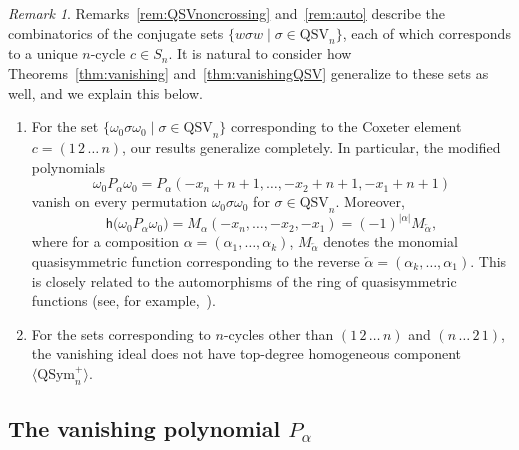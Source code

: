\documentclass[submission]{FPSAC2024}
\theoremstyle{definition}
\theoremstyle{remark}
\newtheorem{rem}[equation]{Remark}
\numberwithin{equation}{section}
\newcommand{\QSym}{\mathrm{QSym}}
\newcommand{\QSV}{\mathrm{QSV}}
\begin{document}
\begin{rem}
Remarks~\ref{rem:QSVnoncrossing} and~\ref{rem:auto} describe the combinatorics of the conjugate sets $\{w \sigma w \;|\; \sigma \in \QSV_{n}\}$, each of which corresponds to a unique $n$-cycle $c \in S_{n}$.  
It is natural to consider how Theorems~\ref{thm:vanishing} and~\ref{thm:vanishingQSV} generalize to these sets as well, and we explain this below.
\begin{enumerate}
\item For the set $\{\omega_{0} \sigma \omega_{0} \;|\; \sigma \in \QSV_{n}\}$ corresponding to the Coxeter element $c = (1\,2\,\ldots\,n)$, our results generalize completely.  In particular, the modified polynomials
	$$\omega_0P_\alpha\omega_0=P_\alpha(-x_n+n+1,\ldots, -x_2+n+1,-x_1+n+1)$$
vanish on every permutation $\omega_{0} \sigma \omega_{0}$ for $\sigma \in \QSV_{n}$. Moreover,
 \[
 \mathsf{h}\big(\omega_0P_\alpha\omega_0\big) = M_{\alpha}(-x_n,\ldots,-x_2,-x_1)=(-1)^{|\alpha|} M_{\overleftarrow{\alpha}},
 \]
where for a composition $\alpha=(\alpha_1,\ldots,\alpha_k)$,  $M_{\overleftarrow{\alpha}}$ denotes the monomial quasisymmetric function corresponding to the reverse $\overleftarrow{\alpha}=(\alpha_k,\ldots,\alpha_1)$.  This is closely related to the automorphisms of the ring of quasisymmetric functions (see, for example,~\cite{JWY}).

\item For the sets corresponding to $n$-cycles other than $(1\,2\,\ldots\,n)$ and $(n\,\ldots\,2\,1)$, the vanishing ideal does not have top-degree homogeneous component $\langle \QSym_{n}^{+} \rangle$.  

\end{enumerate}
\end{rem}





\subsection{The vanishing polynomial $P_{\alpha}$}
\label{sec:QSymvanish}
\end{document}

